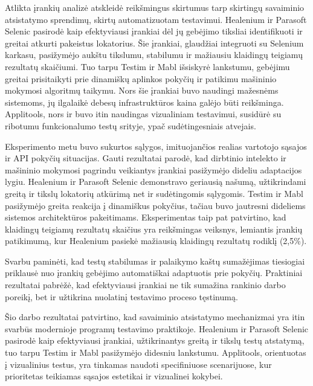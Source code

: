 \documentclass[
]{VUMIFPSkursinis}
\begin{document}

Atlikta įrankių analizė atskleidė reikšmingus skirtumus tarp skirtingų savaiminio atsistatymo sprendimų, skirtų automatizuotam testavimui. Healenium ir Parasoft Selenic pasirodė kaip efektyviausi įrankiai dėl jų gebėjimo tiksliai identifikuoti ir greitai atkurti pakeistus lokatorius. Šie įrankiai, glaudžiai integruoti su Selenium karkasu, pasižymėjo aukštu tikslumu, stabilumu ir mažiausiu klaidingų teigiamų rezultatų skaičiumi. Tuo tarpu Testim ir Mabl išsiskyrė lankstumu, gebėjimu greitai prisitaikyti prie dinamiškų aplinkos pokyčių ir patikimu mašininio mokymosi algoritmų taikymu. Nors šie įrankiai buvo naudingi mažesnėms sistemoms, jų ilgalaikė debesų infrastruktūros kaina galėjo būti reikšminga. Applitools, nors ir buvo itin naudingas vizualiniam testavimui, susidūrė su ribotumu funkcionalumo testų srityje, ypač sudėtingesniais atvejais.

Eksperimento metu buvo sukurtos sąlygos, imituojančios realias vartotojo sąsajos ir API pokyčių situacijas. Gauti rezultatai parodė, kad dirbtinio intelekto ir mašininio mokymosi pagrindu veikiantys įrankiai pasižymėjo dideliu adaptacijos lygiu. Healenium ir Parasoft Selenic demonstravo geriausią našumą, užtikrindami greitą ir tikslų lokatorių atkūrimą net ir sudėtingomis sąlygomis. Testim ir Mabl pasižymėjo greita reakcija į dinamiškus pokyčius, tačiau buvo jautresni dideliems sistemos architektūros pakeitimams. Eksperimentas taip pat patvirtino, kad klaidingų teigiamų rezultatų skaičius yra reikšmingas veiksnys, lemiantis įrankių patikimumą, kur Healenium pasiekė mažiausią klaidingų rezultatų rodiklį (2,5\%).

Svarbu paminėti, kad testų stabilumas ir palaikymo kaštų sumažėjimas tiesiogiai priklausė nuo įrankių gebėjimo automatiškai adaptuotis prie pokyčių. Praktiniai rezultatai pabrėžė, kad efektyviausi įrankiai ne tik sumažina rankinio darbo poreikį, bet ir užtikrina nuolatinį testavimo proceso tęstinumą.


Šio darbo rezultatai patvirtino, kad savaiminio atsistatymo mechanizmai yra itin svarbūs modernioje programų testavimo praktikoje. Healenium ir Parasoft Selenic pasirodė kaip efektyviausi įrankiai, užtikrinantys greitą ir tikslų testų atstatymą, tuo tarpu Testim ir Mabl pasižymėjo didesniu lankstumu. Applitools, orientuotas į vizualinius testus, yra tinkamas naudoti specifiniuose scenarijuose, kur prioritetas teikiamas sąsajos estetikai ir vizualinei kokybei.
\end{document}

